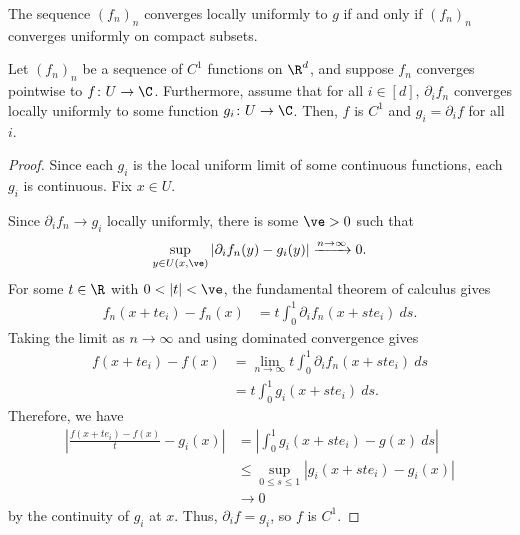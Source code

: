 \documentclass[10pt]{mypackage}
\begin{document}
\begin{theorem}
  The sequence $\left( f_n \right)_n$ converges locally uniformly to $g$ if and only if $\left( f_n \right)_n$ converges uniformly on compact subsets.
\end{theorem}
\begin{proposition}
  Let $\left( f_n \right)_n$ be a sequence of $C^1$ functions on $\R^d$, and suppose $f_n$ converges pointwise to $f\colon U\rightarrow \C$. Furthermore, assume that for all $i\in [d]$, $\partial_i f_n$ converges locally uniformly to some function $g_i\colon U\rightarrow \C$. Then, $f$ is $C^1$ and $g_i = \partial_if$ for all $i$.
\end{proposition}
\begin{proof}
  Since each $g_i$ is the local uniform limit of some continuous functions, each $g_i$ is continuous. Fix $x\in U$.

  Since $\partial_if_n \rightarrow g_i$ locally uniformly, there is some $\ve > 0$ such that
  \begin{align*}
    \sup_{y\in U\left( x,\ve \right)} \left\vert \partial_if_n(y)-g_i(y) \right\vert \xrightarrow{n\rightarrow\infty} 0.
  \end{align*}
  For some $t\in \R$ with $0 < \left\vert t \right\vert < \ve$, the fundamental theorem of calculus gives
  \begin{align*}
    f_n\left( x + te_i \right) - f_n(x) &= t \int_{0}^{1} \partial_if_n\left( x + ste_i \right)\:ds.
  \end{align*}
  Taking the limit as $n\rightarrow\infty$ and using dominated convergence gives
  \begin{align*}
    f\left( x + te_i \right) - f(x) &= \lim_{n\rightarrow\infty} t\int_{0}^{1} \partial_if_n\left( x + ste_i \right)\:ds\\
                                    &= t \int_{0}^{1} g_i\left( x + ste_i \right)\:ds.
  \end{align*}
  Therefore, we have
  \begin{align*}
    \left\vert \frac{f\left( x + te_i \right)-f(x)}{t} -g_i(x) \right\vert &= \left\vert \int_{0}^{1} g_i\left(x + ste_i\right) - g(x)\:ds \right\vert\\
                                                                           &\leq \sup_{0\leq s \leq 1} \left\vert g_i\left( x + ste_i \right)-g_i(x) \right\vert\\
                                                                           &\rightarrow 0
  \end{align*}
  by the continuity of $g_i$ at $x$. Thus, $\partial_i f = g_i$, so $f$ is $C^1$.
\end{proof}
\end{document}
